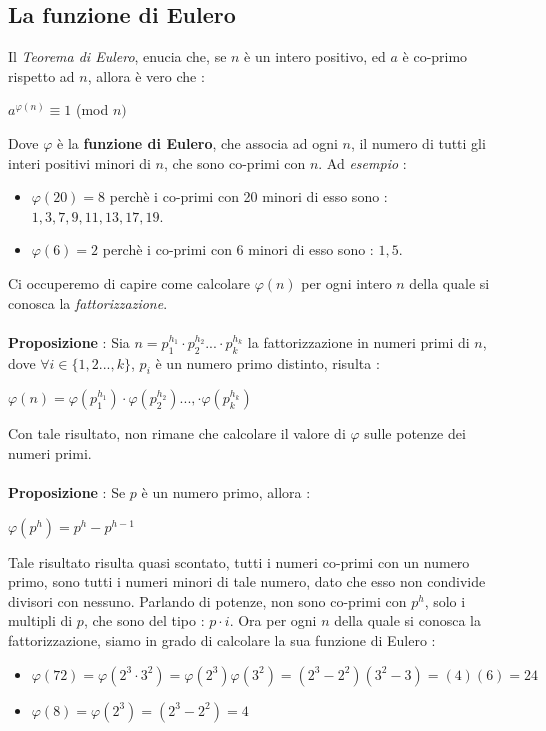 \documentclass[12pt, letterpaper]{article}
\begin{document}
\subsection{La funzione di Eulero}\label{EulerFunc}
Il \textit{Teorema di Eulero}, enucia che, se \(n\) è un intero positivo, ed \(a\) è co-primo rispetto ad \(n\), allora
è vero che :
\begin{center}
    \(a^{\varphi(n)}\equiv 1\) (mod \(n)\)
\end{center} 
Dove \(\varphi\) è la \textbf{funzione di Eulero}, che associa ad ogni \(n\), il numero di tutti gli interi 
positivi minori di \(n\), che sono co-primi con \(n\). Ad \textit{esempio} :\begin{itemize}
    \item \(\varphi(20)=8\) perchè i co-primi con 20 minori di esso sono : \(1,3,7,9,11,13,17,19\).
    \item \(\varphi(6)=2\) perchè i co-primi con 6 minori di esso sono : \(1,5\).
\end{itemize}
Ci occuperemo di capire come calcolare \(\varphi(n)\) per ogni intero \(n\) della quale si conosca la \textit{fattorizzazione}.
\\\hphantom{.}\\\textbf{Proposizione} : Sia \(n=p_1^{h_1}\cdot p_2^{h_2}...\cdot p_k^{h_k}\) la fattorizzazione in numeri 
primi di \(n\), dove \(\forall i \in \{1,2...,k\}\), \(p_i\) è un numero primo distinto, risulta :\begin{center}
    \(
        \varphi(n)=  \varphi(p_1^{h_1})\cdot\varphi(p_2^{h_2})...,\cdot  \varphi(p_k^{h_k})
    \)
\end{center}
Con tale risultato, non rimane che calcolare il valore di \(\varphi\) sulle potenze dei numeri primi.
\\\hphantom{.}\\\textbf{Proposizione }: Se \(p\) è un numero primo, allora :\begin{center}
    \(
        \varphi(p^{h}) = p^h-p^{h-1} 
    \)
\end{center}
Tale risultato risulta quasi scontato, tutti i numeri co-primi con un numero primo, sono tutti i numeri minori 
di tale numero, dato che esso non condivide divisori con nessuno. Parlando di potenze, non sono co-primi con 
\(p^h\), solo i multipli di \(p\), che sono del tipo : \(p\cdot i\). Ora per ogni \(n\) della quale si conosca la fattorizzazione, 
siamo in grado di calcolare la sua funzione di Eulero : \begin{itemize}
    \item \(\varphi(72)=\varphi(2^3\cdot 3^2)=\varphi(2^3)\varphi(3^2)=(2^3-2^2)(3^2-3)=(4)(6)=24\)
    \item \(\varphi(8)=\varphi(2^3)=(2^3-2^2)=4\)
\end{itemize}
\end{document}
